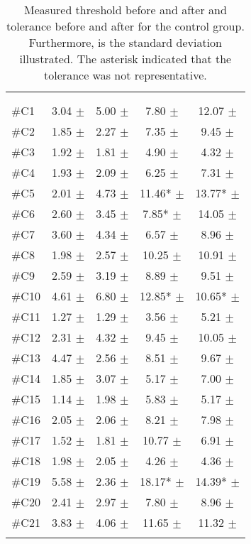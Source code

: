 \begin{longtable} {l|c|c|c|c}
 \rowcolor[HTML]{C0C0C0} 
  \color[HTML]{000000}{} & 
 \multicolumn{2}{c|}{ \color[HTML]{000000}{\textbf{Threshold}}} & \multicolumn{2}{c}{ \color[HTML]{000000}{\textbf{Tolerance}}}  	\\  \rule{0pt}{3ex} 
  \cellcolor[HTML]{C0C0C0}{} &
 \multicolumn{1}{c|}{ \cellcolor[HTML]{C0C0C0}{Pre [KgF]}} & \multicolumn{1}{c|}{ \cellcolor[HTML]{C0C0C0}{Post [KgF]}} & \multicolumn{1}{|c|}{ \cellcolor[HTML]{C0C0C0}{Pre [KgF]}} 
 & \multicolumn{1}{c|}{ \cellcolor[HTML]{C0C0C0}{Post [KgF]}} 	\\ \hline   
\#C1 & 3.04 $\pm$ 	& 5.00 $\pm$ 	& 7.80 $\pm$	& 12.07 $\pm$  \\ \hline
\#C2 & 1.85 $\pm$  	& 2.27 $\pm$ 	& 7.35 $\pm$ 	& 9.45 $\pm$ 	\\ \hline
\#C3 & 1.92 $\pm$  & 1.81 $\pm$ 	& 4.90 $\pm$ 	& 	4.32 $\pm$ 	\\ \hline
\#C4 & 1.93 $\pm$ 	& 2.09 $\pm$ 	& 6.25 $\pm$ 	&7.31 $\pm$ 	\\ \hline
\#C5 & 2.01 $\pm$ 	& 4.73  $\pm$ 	& 11.46* $\pm$  	& 13.77* $\pm$	\\ \hline
\#C6 & 2.60 $\pm$  	& 3.45 $\pm$ 		& 7.85* $\pm$ 	& 14.05 $\pm$	\\ \hline	
\#C7 & 3.60 $\pm$  & 4.34 $\pm$		& 6.57 $\pm$  & 8.96 $\pm$  \\ \hline
\#C8 & 1.98 $\pm$  & 2.57 $\pm$		& 10.25 $\pm$ 	& 10.91 $\pm$  \\ \hline
\#C9 & 2.59 $\pm$  & 3.19 $\pm$ 	& 8.89 $\pm$ 	& 9.51 $\pm$ 	\\ \hline
\#C10 & 4.61 $\pm$  & 6.80 $\pm$ 		& 12.85* $\pm$ 	& 10.65*  $\pm$ \\ \hline
\#C11 & 1.27 $\pm$  & 1.29 	$\pm$ 	& 3.56	 $\pm$ & 5.21 $\pm$ \\ \hline
\#C12 & 2.31 $\pm$  & 4.32 $\pm$ 	& 9.45 $\pm$  & 10.05 $\pm$   \\ \hline
\#C13 & 4.47 $\pm$  & 2.56 $\pm$	& 8.51 $\pm$  & 9.67 $\pm$ \\ \hline
\#C14 & 1.85 $\pm$  & 3.07 $\pm$	 & 5.17 $\pm$  & 7.00 $\pm$  \\ \hline
\#C15 & 1.14 $\pm$  & 1.98 $\pm$  & 5.83 $\pm$  & 5.17 $\pm$ \\ \hline
\#C16 & 2.05 $\pm$  & 2.06 $\pm$  & 8.21 $\pm$  & 7.98 $\pm$  \\ \hline
\#C17 & 1.52 $\pm$  & 1.81 $\pm$  & 10.77 $\pm$  & 6.91 $\pm$  \\ \hline
\#C18 & 1.98  $\pm$ & 2.05 $\pm$  & 4.26  $\pm$  &  4.36 $\pm$  \\ \hline
\#C19 & 5.58  $\pm$  & 2.36 $\pm$  & 18.17* $\pm$  & 14.39* $\pm$ \\ \hline
\#C20 & 2.41 $\pm$  & 2.97 $\pm$   & 7.80 $\pm$  &  8.96 $\pm$ \\ \hline
\#C21 & 3.83 $\pm$  & 4.06 $\pm$   & 11.65 $\pm$  & 11.32 $\pm$ \\ \hline
	\caption{Measured threshold before and after and tolerance before and after for the control group. Furthermore, is the standard deviation illustrated. The asterisk indicated that the tolerance was not representative.}
	\label{tab:ControlA}
\end{longtable}